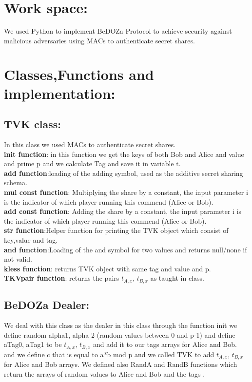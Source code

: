 \documentclass{article}
\begin{document}
\section*{Work space:}
We used Python to implement BeDOZa Protocol to achieve security against malicious adversaries using MACs to authenticate secret shares.
\section*{Classes,Functions and implementation:}
\subsection*{TVK class:}
In this class we used MACs to authenticate secret shares.
\\ \textbf{init function}: in this function we get the keys of both Bob and Alice and value and prime p and we calculate Tag and save it in variable t.
\\ \textbf{add function}:loading of the adding symbol, used as the additive secret sharing schema.
\\ \textbf{ mul const function}: Multiplying the share by a constant, the input parameter i is the indicator of which player running this commend (Alice or Bob).
\\ \textbf{add const function}: Adding the share by a constant, the input parameter i is the indicator of which player running this commend (Alice or Bob).
\\ \textbf{str function}:Helper function for printing the TVK object which consist of key,value and tag.
\\ \textbf{and function}:Loading of the and symbol for two values and returns null/none if not valid.
\\ \textbf{kless function}: returns TVK object with same tag and value and p.
 \\ \textbf{TKVpair function}: returns the pairs $t_{A,x}$, $t_{B,x}$  as taught in class.
\subsection*{BeDOZa Dealer:}
We deal with this class as the dealer in this class through the function init we define random alpha1, alpha 2 (random values between 0 and p-1) and define aTag0, aTag1 to be $t_{A,x}$, $t_{B,x}$ and add it to our tags arrays for Alice and Bob.  and we define c that is equal to a*b mod p and we called TVK to add $t_{A,x}$, $t_{B,x}$ for Alice and Bob arrays.
We defined also RandA and RandB  functions which return the arrays of random values to Alice and Bob and the tags .
\end{document}
